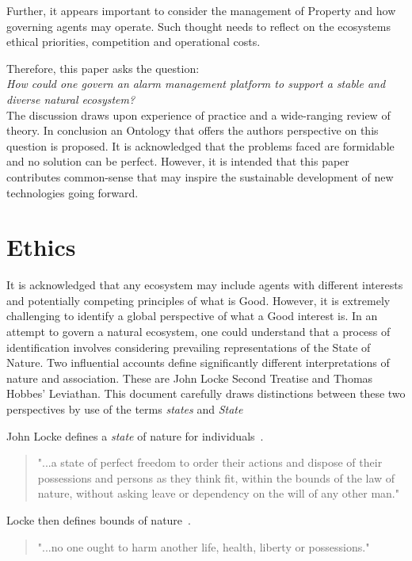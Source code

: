 \documentclass[11pt, oneside]{article}   	%
\begin{document}
Further, it appears important to consider the management of Property and how governing agents may operate.
Such thought needs to reflect on the ecosystems ethical priorities, competition and operational costs.\

Therefore, this paper asks the question:\\

\emph{How could one govern an alarm management platform to support a stable and diverse natural ecosystem?}\\

The discussion draws upon experience of practice and a wide-ranging review of theory.
In conclusion an Ontology that offers the authors perspective on this question is proposed.
It is acknowledged that the problems faced are formidable and no solution can be perfect.
However, it is intended that this paper contributes common-sense that may inspire the sustainable development of new technologies going forward.\

\pagebreak

\section{Ethics}
It is acknowledged that any ecosystem may include agents with different interests and potentially competing principles of what is Good.
However, it is extremely challenging to identify a global perspective of what a Good interest is.
In an attempt to govern a natural ecosystem, one could understand that a process of identification involves considering prevailing representations of the State of Nature.
Two influential accounts define significantly different interpretations of nature and association.
These are John Locke Second Treatise and Thomas Hobbes' Leviathan.
This document carefully draws distinctions between these two perspectives by use of the terms \emph{states} and \emph{State}\

John Locke defines a \emph{state} of nature for individuals~\cite{jl1}.

\begin{quote}
"...a state of perfect freedom to order their actions and dispose of their possessions and persons as they think fit, within the bounds of the law of nature, without asking leave or dependency on the will of any other man."
\end{quote}

Locke then defines bounds of nature~\cite{jl1}.

\begin{quote}
"...no one ought to harm another life, health, liberty or possessions."
\end{quote}
\end{document}
